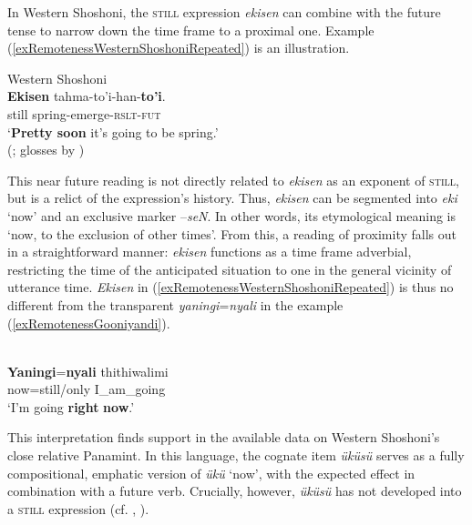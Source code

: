  In Western Shoshoni, the \textsc{still} expression \textit{ekisen} can combine with the future tense to narrow down the time frame to a proximal one. Example (\ref{exRemotenessWesternShoshoniRepeated}) is an illustration.

\begin{exe}
	\ex Western Shoshoni \label{exRemotenessWesternShoshoniRepeated}\\
	\gll \textbf{Ekisen} tahma-to'i-han-\textbf{to'i}.\\
	still spring-emerge-\textsc{rslt}-\textsc{fut}\\
	\glt \lq \textbf{Pretty soon} it’s going to be spring.'
	\\(\cite[150]{CrumDayley1993}; glosses by \cite[68]{McLaughlin2012})
\end{exe}

This near future reading is not directly related to \textit{ekisen} as an exponent of \textsc{still}, but is a relict of the expression's history. Thus, \textit{ekisen} can be segmented into \textit{eki} \lq now' and an exclusive marker \mbox{–\textit{seN}}. In other words, its etymological meaning is \lq now, to the exclusion of other times'. From this, a reading of proximity falls out in a straightforward manner: \textit{ekisen} functions as a time frame adverbial, restricting the time of the anticipated situation to one in the general vicinity of utterance time. \textit{Ekisen} in (\ref{exRemotenessWesternShoshoniRepeated}) is thus no different from the transparent \textit{yaningi}\mbox{=\textit{nyali}} in the  example (\ref{exRemotenessGooniyandi}).

\begin{exe}
	\ex {}\label{exRemotenessGooniyandi}\\
	\gll \textbf{Yaningi}=\textbf{nyali} thithiwalimi\\
	now=still/only I\_am\_going\\
	\glt \lq I'm going \textbf{right} \textbf{now}.' \parencite[466]{McGregor1990}
\end{exe}

This interpretation finds support in the available data on Western Shoshoni's close relative Panamint. In this language, the cognate item \textit{üküsü} serves as a fully compositional, emphatic version of \textit{ükü} \lq now', with the expected effect in combination with a future  verb. Crucially, however,  \textit{üküsü} has not developed into a \textsc{still} expression (cf. \cite[369]{Dayley1989Dictionary}, \citeyear*[300]{Dayley1989Grammar}).

